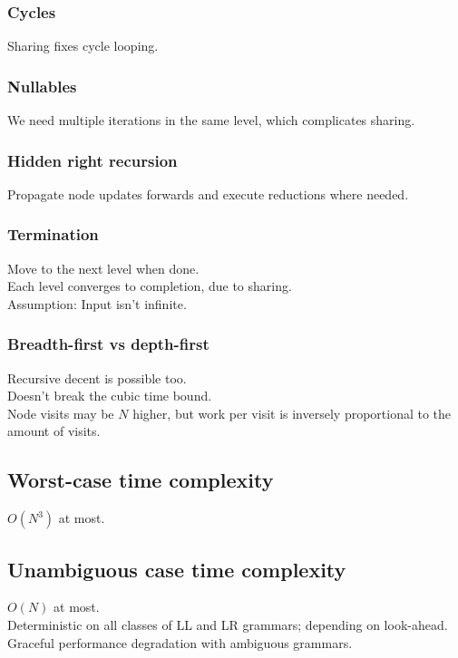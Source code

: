 \documentclass[a4paper,10pt]{article}
\begin{document}
\subsubsection{Cycles}

Sharing fixes cycle looping.

\subsubsection{Nullables}

We need multiple iterations in the same level, which complicates sharing.

\subsubsection{Hidden right recursion}

Propagate node updates forwards and execute reductions where needed.

\subsubsection{Termination}

Move to the next level when done.\\
Each level converges to completion, due to sharing.\\
Assumption: Input isn't infinite.

\subsubsection{Breadth-first vs depth-first}

Recursive decent is possible too.\\
Doesn't break the cubic time bound.\\
Node visits may be $N$ higher, but work per visit is inversely proportional to the amount of visits.

\subsection{Worst-case time complexity}

$O(N^3)$ at most.

\subsection{Unambiguous case time complexity}

$O(N)$ at most.\\
Deterministic on all classes of LL and LR grammars; depending on look-ahead.\\
Graceful performance degradation with ambiguous grammars.
\end{document}
